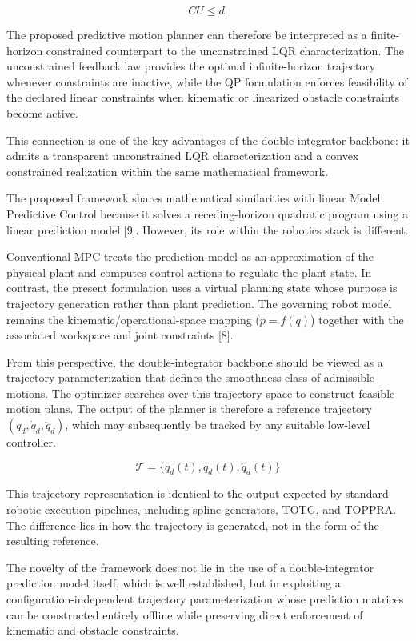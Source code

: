 \[ CU \le d. \]

The proposed predictive motion planner can therefore be interpreted as a
finite-horizon constrained counterpart to the unconstrained LQR
characterization. The unconstrained feedback law provides the optimal
infinite-horizon trajectory whenever constraints are inactive, while the
QP formulation enforces feasibility of the declared linear constraints
when kinematic or linearized obstacle constraints become active.

This connection is one of the key advantages of the double-integrator
backbone: it admits a transparent unconstrained LQR characterization and
a convex constrained realization within the same mathematical framework.

The proposed framework shares mathematical similarities with linear
Model Predictive Control because it solves a receding-horizon quadratic
program using a linear prediction model {[}9{]}. However, its role
within the robotics stack is different.

Conventional MPC treats the prediction model as an approximation of the
physical plant and computes control actions to regulate the plant state.
In contrast, the present formulation uses a virtual planning state whose
purpose is trajectory generation rather than plant prediction. The
governing robot model remains the kinematic/operational-space mapping
(\(p=f(q)\)) together with the associated workspace and joint
constraints {[}8{]}.

From this perspective, the double-integrator backbone should be viewed
as a trajectory parameterization that defines the smoothness class of
admissible motions. The optimizer searches over this trajectory space to
construct feasible motion plans. The output of the planner is therefore
a reference trajectory \((q_d,\dot q_d,\ddot q_d)\), which may
subsequently be tracked by any suitable low-level controller.

\[\mathcal T = \{q_d(t),\dot q_d(t),\ddot q_d(t)\} \]

This trajectory representation is identical to the output expected by
standard robotic execution pipelines, including spline generators, TOTG,
and TOPPRA. The difference lies in how the trajectory is generated, not
in the form of the resulting reference.

The novelty of the framework does not lie in the use of a
double-integrator prediction model itself, which is well established,
but in exploiting a configuration-independent trajectory
parameterization whose prediction matrices can be constructed entirely
offline while preserving direct enforcement of kinematic and obstacle
constraints.

